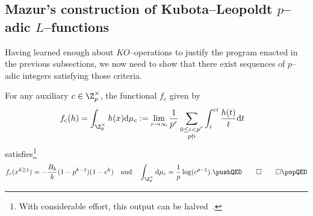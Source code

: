 \subsection{Mazur's construction of Kubota--Leopoldt \(p\)--adic \(L\)--functions}

Having learned enough about \(KO\)--operations to justify the program enacted in the previous subsections, we now need to show that there exist sequences of \(p\)--adic integers satisfying those criteria.

\begin{theorem}\label{MazurMeasuresThm}
For any auxiliary \(c \in \Z_p^\times\), the functional \(f_c\) given by
\begin{align*}
f_c(h) = \int_{\Z_p^\times} h(x) \mathrm d\mu_c & := \lim_{r \to \infty} \frac{1}{p^r} \sum_{\substack{0 \le i < p^r \\ p \nmid i}} \int_i^{ci} \frac{h(t)}{t} \mathrm dt
\end{align*}
satisfies\footnote{With considerable effort, this output can be halved~\cite[Section 10.3]{AHR}.} \[f_c(x^{k \ge 1}) = -\frac{B_k}{k}(1 - p^{k-1})(1 - c^k) \quad \text{and} \quad \int_{\Z_p^\times} \mathrm d\mu_c = \frac{1}{p} \log(c^{p-1}). \pushQED\qed \qedhere \popQED\]
\end{theorem}

